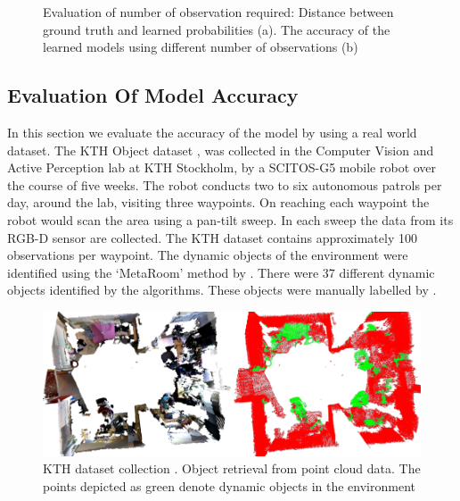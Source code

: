 \begin{figure}
\begin{subfigure}[b]{0.4\textwidth}
        \caption{}
        \label{fig:object_simulation_accuracy}
    \end{subfigure}
    \caption[Evaluation of number of observation required]{Evaluation of number of observation required: Distance between ground truth and learned probabilities (a). The accuracy of the learned models using different number of observations (b) }\label{fig:object_simulation_accuracy}
\end{figure}

\FloatBarrier
\subsection{Evaluation Of Model Accuracy}

In this section we evaluate the accuracy of the model by using a real world dataset. The KTH Object dataset \cite{krajnik_wheres_2015}, was collected in the Computer Vision and Active Perception lab at KTH Stockholm, by a SCITOS-G5 mobile robot over  the  course  of  five  weeks.  The robot conducts two to six autonomous patrols per day, around the lab, visiting three waypoints. On reaching each waypoint the robot would scan the area using a pan-tilt sweep. In each sweep the data from its RGB-D sensor are collected. The KTH dataset contains approximately 100 observations per waypoint. The dynamic objects of the environment were identified  using the `MetaRoom' method by \cite{ambrucs2014meta}. There were 37 different dynamic objects identified by the algorithms. These objects were manually labelled by \cite{krajnik_wheres_2015}.

\begin{figure}[htp]
\centering
\includegraphics[width=\textwidth]{images/kth-dataset-fromsite.png}
\caption[KTH dataset collection]{KTH dataset collection \cite{krajnik_wheres_2015}. Object retrieval from point cloud data. The points depicted as green denote dynamic objects in the environment}
\label{fig:KTH-dataset}
\end{figure}



